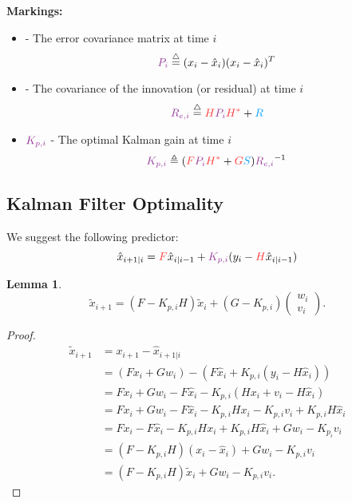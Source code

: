 \documentclass[a4 paper]{article}
\numberwithin{equation}{section}
\theoremstyle{boldStyle}
\theoremstyle{boldBlueStyle}
\newtheorem{lemma}{Lemma}[section]
\theoremstyle{boldPurpleStyle}
\theoremstyle{boldRedStyle}
\begin{document}
\textbf{Markings:}
\begin{itemize}
    \item {} - The error covariance matrix at time \( i \)
    \begin{equation}
        \tpur{P_i} \eqdef (x_i - \hat{x}_i)(x_i - \hat{x}_i)^T
    \end{equation}

    \item {} - The covariance of the innovation (or residual) at time \( i \)
    \begin{equation}
        \tpur{R_{e,i}} \eqdef \tred{H} \tpur{P_i} \tred{H^*} + \tblu{R}  
    \end{equation}

    \item \(\tpur{K_{p,i}}\) - The optimal Kalman gain at time \( i \)
    \begin{equation}
        \tpur{K_{p,i}} \triangleq (\tred{F} \tpur{P_i} \tred{H^*} + \tred{G}\tblu{S}) \tpur{R_{e,i}}^{-1}
    \end{equation}

\end{itemize}

\subsection*{Kalman Filter Optimality}

We suggest the following predictor:
\begin{equation}
    \hat{x}_{i+1|i} = \tred{F} \hat{x}_{i|i-1} + \tpur{K_{p,i}} (y_i - \tred{H} \hat{x}_{i|i-1})
\end{equation}

\begin{lemma}
  \begin{equation}
    \tilde{x}_{i+1} = (F - K_{p,i} H) \tilde{x}_i + (G - K_{p,i}) 
    \begin{pmatrix}
    w_i \\
    v_i
    \end{pmatrix}.
    \end{equation}
\end{lemma}

\begin{proof}
\begin{align*}
\tilde{x}_{i+1} &= x_{i+1} - \hat{x}_{i+1|i} \\
&= (F x_i + G w_i) - \left( F \hat{x}_i + K_{p,i} (y_i - H \hat{x}_i) \right) \\
&= F x_i + G w_i - F \hat{x}_i - K_{p,i} (H x_i + v_i - H \hat{x}_i) \\
&= F x_i + G w_i - F \hat{x}_i - K_{p,i} H x_i - K_{p,i} v_i + K_{p,i} H \hat{x}_i \\
&= F x_i - F \hat{x}_i - K_{p,i} H x_i + K_{p,i} H \hat{x}_i + G w_i - K_{p_i} v_i \\
&= (F - K_{p,i} H)(x_i - \hat{x}_i) + G w_i - K_{p,i} v_i \\
&= (F - K_{p,i} H) \tilde{x}_i + G w_i - K_{p,i} v_i.
\end{align*}
\end{proof}
\end{document}
